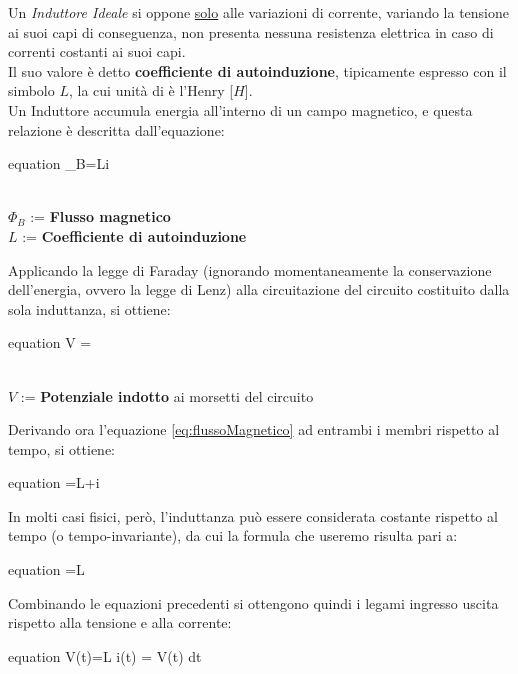 \begin{de}
	Un \textit{Induttore Ideale} si oppone \underline{solo} alle variazioni di corrente, variando la tensione ai suoi capi di conseguenza, non presenta nessuna resistenza elettrica in caso di correnti costanti ai suoi capi.\\
	Il suo valore è detto \textbf{coefficiente di autoinduzione}, tipicamente espresso con il simbolo $L$, la cui unità di è l'Henry [$H$].\\
	Un Induttore accumula energia all'interno di un campo magnetico, e questa relazione è descritta dall'equazione:
	\begin{vwcol}[widths={0.4,0.6}, sep=8mm, rule=0px]
		\vspace{-3mm}
		\begin{empheq}[box=\mathStep]{equation} \label{eq:flussoMagnetico}
			\Phi _{B}=Li
		\end{empheq}
		\newpage %
		\hfill\\[-2mm]
		$ \Phi _{B} $ := \textbf{Flusso magnetico}\\
		$L$ := \textbf{Coefficiente di autoinduzione}
	\end{vwcol}
	\noindent
	Applicando la legge di Faraday (ignorando momentaneamente la conservazione dell'energia, ovvero la legge di Lenz) alla circuitazione del circuito costituito dalla sola induttanza, si ottiene:
	\begin{vwcol}[widths={0.4,0.6}, sep=8mm, rule=0px]
		\vspace{-3mm}
		\begin{empheq}[box=\mathStep]{equation}
			V = 
		\end{empheq}
		\newpage %
		\hfill\break \hfill\\[-2mm]
		$ V $ := \textbf{Potenziale indotto} ai morsetti del circuito
	\end{vwcol}
	\noindent
	Derivando ora l'equazione \ref{eq:flussoMagnetico} ad entrambi i membri rispetto al tempo, si ottiene:
	\begin{empheq}[box=\mathStep]{equation}
		\displaystyle {}=L{}+i{}
	\end{empheq}
	In molti casi fisici, però, l'induttanza può essere considerata costante rispetto al tempo (o tempo-invariante), da cui la formula che useremo risulta pari a:
	\begin{empheq}[box=\mathStep]{equation}
		=L{}
	\end{empheq}
	Combinando le equazioni precedenti si ottengono quindi i legami ingresso uscita rispetto alla tensione e alla corrente:
	\begin{empheq}[box=\mathCalc]{equation}
		{\displaystyle V(t)={L{}}} \Leftrightarrow i(t) =  \int V(t) dt
	\end{empheq}
\end{de}
